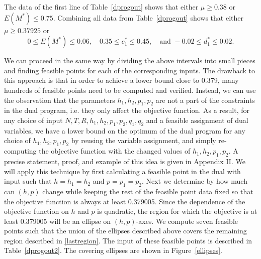 \documentclass[12pt]{article}
\numberwithin{equation}{section}
\begin{document}
The data of the first line of Table~\ref{dprogout} shows that either $\mu \geq 0.38$ or $E(M^\ast) \leq 0.75$. Combining all data from Table~\ref{dprogout} shows that either $\mu \geq 0.37925$ or 
\begin{equation}\label{lastregion} 0 \leq E(M^\ast) \leq 0.06, \quad 0.35 \leq c_1^\ast \leq 0.45, \quad \text{and } -0.02 \leq d_1^\ast \leq 0.02.\end{equation}


We can proceed in the same way by dividing the above intervals into small pieces and finding feasible points for each of the corresponding inputs. The drawback to this approach is that in order to achieve a lower bound close to 0.379, many hundreds of feasible points need to be computed and verified. Instead, we can use the observation that the parameters $h_1,h_2,p_1,p_2$ are not a part of the constraints in the dual program, i.e. they only affect the objective function. As a result, for any choice of input $N,T,R,h_1,h_2,p_1,p_2,q_1,q_2$ and a feasible assignment of dual variables, we have a lower bound on the optimum of the dual program for any choice of $h_1,h_2,p_1,p_2$ by reusing the variable assignment, and simply re-computing the objective function with the changed values of $h_1,h_2,p_1,p_2$. A precise statement, proof, and example of this idea is given in Appendix II. We will apply this technique by first calculating a feasible point in the dual with input such that $h = h_1=h_2$ and $p = p_1 = p_2$. Next we determine by how much can $(h,p)$ change while keeping the rest of the feasible point data fixed so that the objective function is always at least 0.379005. Since the dependence of the objective function on $h$ and $p$ is quadratic, the region for which the objective is at least 0.379005 will be an ellipse on $(h,p)$-axes. We compute seven feasible points such that the union of the ellipses described above covers the remaining region described in \eqref{lastregion}. The input of these feasible points is described in Table~\ref{dprogout2}. The covering ellipses are shown in Figure~\ref{ellipses}. 
\end{document}

